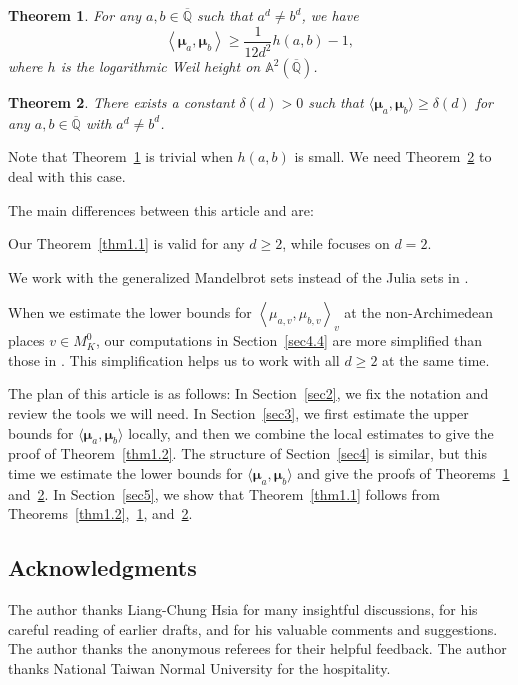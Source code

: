 \documentclass[11pt]{amsart}
\numberwithin{equation}{section}
\theoremstyle{plain}
\newtheorem{thm}{Theorem}[section]
\theoremstyle{definition}
\theoremstyle{remark}
\newcommand{\A}{\mathbb A}
\newcommand{\Q}{\mathbb Q}
\renewcommand{\bar}{\overline}
\begin{document}
\begin{thm}\label{thm1.3}
  For any $a,b\in\bar{\Q}$ such that $a^{d}\neq b^{d}$,
we have
\[
\left\langle \boldsymbol{\mu}_{a},\boldsymbol{\mu}_{b}\right\rangle \geq\frac{1}{12d^{2}}h(a,b)-1,
\]
where $h$ is the logarithmic Weil height on $\A^{2}(\bar{\Q})$.
\end{thm}

\begin{thm} \label{thm1.4}
  There exists a constant $\delta(d)>0$ such that $\langle \boldsymbol{\mu}_{a},\boldsymbol{\mu}_{b}\rangle \geq\delta(d)$
for any $a,b\in\bar{\Q}$ with $a^{d}\neq b^{d}$.
\end{thm}

Note that Theorem~\ref{thm1.3} is trivial when $h(a,b)$ is small.
We need Theorem~\ref{thm1.4} to deal with this case.

The main differences between this article and \cite{DKY2} are:
\begin{enumerate*}\item
Our Theorem~\ref{thm1.1} is valid for any $d\geq2$, while
\cite[Theorem 1.1]{DKY2} focuses on $d=2$. \item We work with the
generalized Mandelbrot sets instead of the Julia sets in
\cite{DKY2}. \item When we estimate the lower bounds for $\left\langle
\mu_{a,v},\mu_{b,v}\right\rangle _{v}$ at the non-Archimedean places
$v\in M_{K}^{0}$, our computations in Section~\ref{sec4.4} are more
simplified than those in \cite[Sections 5 and~6]{DKY2}.  This
simplification helps us to work with all $d\geq2$ at the same
time.\end{enumerate*}

The plan of this article is as follows: In Section~\ref{sec2}, we fix
the notation and review the tools we will need. In Section~\ref{sec3},
we first estimate the upper bounds for $\langle
\boldsymbol{\mu}_{a},\boldsymbol{\mu}_{b}\rangle $ locally, and then
we combine the local estimates to give the proof of
Theorem~\ref{thm1.2}. The structure of Section~\ref{sec4} is similar,
but this time we estimate the lower bounds for $\langle
\boldsymbol{\mu}_{a},\boldsymbol{\mu}_{b}\rangle $ and give the proofs
of Theorems~\ref{thm1.3} and~\ref{thm1.4}. In Section~\ref{sec5}, we
show that Theorem~\ref{thm1.1} follows from
Theorems~\ref{thm1.2},~\ref{thm1.3}, and~\ref{thm1.4}.


\subsection*{Acknowledgments} The author thanks Liang-Chung Hsia for
many insightful discussions, for his careful reading of earlier drafts,
and for his valuable comments and suggestions. The author thanks the
anonymous referees for their helpful feedback. The author thanks National
Taiwan Normal University for the hospitality.
\end{document}
